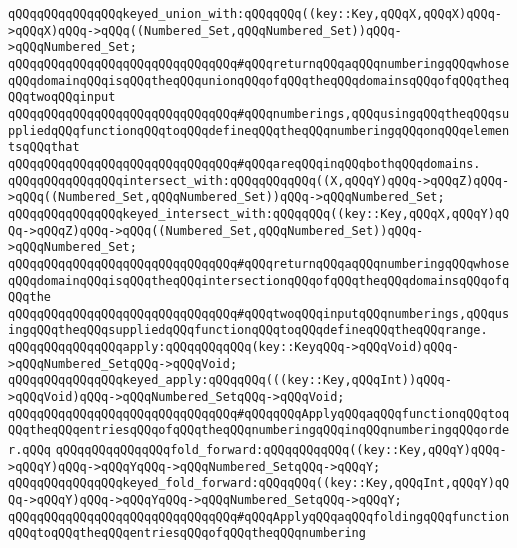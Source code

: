 \verb|qQQqqQQqqQQqqQQqkeyed_union_with:qQQqqQQq((key::Key,qQQqX,qQQqX)qQQq->qQQqX)qQQq->qQQq((Numbered_Set,qQQqNumbered_Set))qQQq->qQQqNumbered_Set;|\newline
\verb|qQQqqQQqqQQqqQQqqQQqqQQqqQQqqQQq#qQQqreturnqQQqaqQQqnumberingqQQqwhoseqQQqdomainqQQqisqQQqtheqQQqunionqQQqofqQQqtheqQQqdomainsqQQqofqQQqtheqQQqtwoqQQqinput|\newline
\verb|qQQqqQQqqQQqqQQqqQQqqQQqqQQqqQQq#qQQqnumberings,qQQqusingqQQqtheqQQqsuppliedqQQqfunctionqQQqtoqQQqdefineqQQqtheqQQqnumberingqQQqonqQQqelementsqQQqthat|\newline
\verb|qQQqqQQqqQQqqQQqqQQqqQQqqQQqqQQq#qQQqareqQQqinqQQqbothqQQqdomains.|\newline
\newline
\verb|qQQqqQQqqQQqqQQqintersect_with:qQQqqQQqqQQq((X,qQQqY)qQQq->qQQqZ)qQQq->qQQq((Numbered_Set,qQQqNumbered_Set))qQQq->qQQqNumbered_Set;|\newline
\verb|qQQqqQQqqQQqqQQqkeyed_intersect_with:qQQqqQQq((key::Key,qQQqX,qQQqY)qQQq->qQQqZ)qQQq->qQQq((Numbered_Set,qQQqNumbered_Set))qQQq->qQQqNumbered_Set;|\newline
\verb|qQQqqQQqqQQqqQQqqQQqqQQqqQQqqQQq#qQQqreturnqQQqaqQQqnumberingqQQqwhoseqQQqdomainqQQqisqQQqtheqQQqintersectionqQQqofqQQqtheqQQqdomainsqQQqofqQQqthe|\newline
\verb|qQQqqQQqqQQqqQQqqQQqqQQqqQQqqQQq#qQQqtwoqQQqinputqQQqnumberings,qQQqusingqQQqtheqQQqsuppliedqQQqfunctionqQQqtoqQQqdefineqQQqtheqQQqrange.|\newline
\newline
\verb|qQQqqQQqqQQqqQQqapply:qQQqqQQqqQQq(key::KeyqQQq->qQQqVoid)qQQq->qQQqNumbered_SetqQQq->qQQqVoid;|\newline
\verb|qQQqqQQqqQQqqQQqkeyed_apply:qQQqqQQq(((key::Key,qQQqInt))qQQq->qQQqVoid)qQQq->qQQqNumbered_SetqQQq->qQQqVoid;|\newline
\verb|qQQqqQQqqQQqqQQqqQQqqQQqqQQqqQQq#qQQqqQQqApplyqQQqaqQQqfunctionqQQqtoqQQqtheqQQqentriesqQQqofqQQqtheqQQqnumberingqQQqinqQQqnumberingqQQqorder.qQQq|\newline
\newline
\verb|qQQqqQQqqQQqqQQqfold_forward:qQQqqQQqqQQq((key::Key,qQQqY)qQQq->qQQqY)qQQq->qQQqYqQQq->qQQqNumbered_SetqQQq->qQQqY;|\newline
\verb|qQQqqQQqqQQqqQQqkeyed_fold_forward:qQQqqQQq((key::Key,qQQqInt,qQQqY)qQQq->qQQqY)qQQq->qQQqYqQQq->qQQqNumbered_SetqQQq->qQQqY;|\newline
\verb|qQQqqQQqqQQqqQQqqQQqqQQqqQQqqQQq#qQQqApplyqQQqaqQQqfoldingqQQqfunctionqQQqtoqQQqtheqQQqentriesqQQqofqQQqtheqQQqnumbering|\newline

